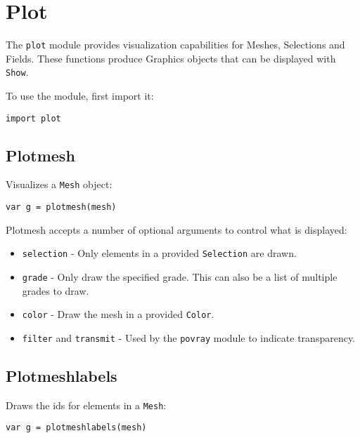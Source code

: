 \hypertarget{plot}{%
\section{Plot}\label{plot}}

The \texttt{plot} module provides visualization capabilities for Meshes,
Selections and Fields. These functions produce Graphics objects that can
be displayed with \texttt{Show}.

To use the module, first import it:

\begin{lstlisting}
import plot
\end{lstlisting}

\hypertarget{plotmesh}{%
\subsection{Plotmesh}\label{plotmesh}}

Visualizes a \texttt{Mesh} object:

\begin{lstlisting}
var g = plotmesh(mesh)
\end{lstlisting}

Plotmesh accepts a number of optional arguments to control what is
displayed:

\begin{itemize}

\item
  \texttt{selection} - Only elements in a provided \texttt{Selection}
  are drawn.
\item
  \texttt{grade} - Only draw the specified grade. This can also be a
  list of multiple grades to draw.
\item
  \texttt{color} - Draw the mesh in a provided \texttt{Color}.
\item
  \texttt{filter} and \texttt{transmit} - Used by the \texttt{povray}
  module to indicate transparency.
\end{itemize}

\hypertarget{plotmeshlabels}{%
\subsection{Plotmeshlabels}\label{plotmeshlabels}}

Draws the ids for elements in a \texttt{Mesh}:

\begin{lstlisting}
var g = plotmeshlabels(mesh) 
\end{lstlisting}

